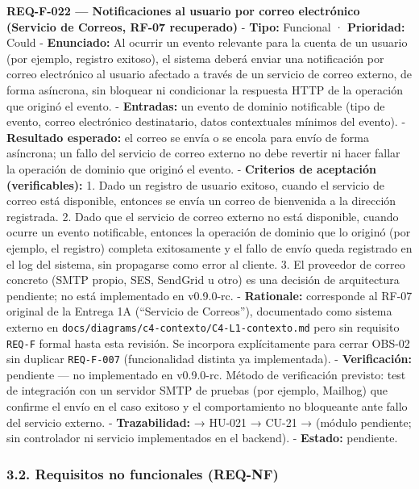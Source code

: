 \documentclass[
]{article}
\begin{document}
\textbf{REQ-F-022 --- Notificaciones al usuario por correo electrónico
(Servicio de Correos, RF-07 recuperado)} - \textbf{Tipo:} Funcional ·
\textbf{Prioridad:} Could - \textbf{Enunciado:} Al ocurrir un evento
relevante para la cuenta de un usuario (por ejemplo, registro exitoso),
el sistema deberá enviar una notificación por correo electrónico al
usuario afectado a través de un servicio de correo externo, de forma
asíncrona, sin bloquear ni condicionar la respuesta HTTP de la operación
que originó el evento. - \textbf{Entradas:} un evento de dominio
notificable (tipo de evento, correo electrónico destinatario, datos
contextuales mínimos del evento). - \textbf{Resultado esperado:} el
correo se envía o se encola para envío de forma asíncrona; un fallo del
servicio de correo externo no debe revertir ni hacer fallar la operación
de dominio que originó el evento. - \textbf{Criterios de aceptación
(verificables):} 1. Dado un registro de usuario exitoso, cuando el
servicio de correo está disponible, entonces se envía un correo de
bienvenida a la dirección registrada. 2. Dado que el servicio de correo
externo no está disponible, cuando ocurre un evento notificable,
entonces la operación de dominio que lo originó (por ejemplo, el
registro) completa exitosamente y el fallo de envío queda registrado en
el log del sistema, sin propagarse como error al cliente. 3. El
proveedor de correo concreto (SMTP propio, SES, SendGrid u otro) es una
decisión de arquitectura pendiente; no está implementado en v0.9.0-rc. -
\textbf{Rationale:} corresponde al RF-07 original de la Entrega 1A
(``Servicio de Correos''), documentado como sistema externo en
\texttt{docs/diagrams/c4-contexto/C4-L1-contexto.md} pero sin requisito
\texttt{REQ-F} formal hasta esta revisión. Se incorpora explícitamente
para cerrar OBS-02 sin duplicar \texttt{REQ-F-007} (funcionalidad
distinta ya implementada). - \textbf{Verificación:} pendiente --- no
implementado en v0.9.0-rc. Método de verificación previsto: test de
integración con un servidor SMTP de pruebas (por ejemplo, Mailhog) que
confirme el envío en el caso exitoso y el comportamiento no bloqueante
ante fallo del servicio externo. - \textbf{Trazabilidad:} → HU-021 →
CU-21 → (módulo pendiente; sin controlador ni servicio implementados en
el backend). - \textbf{Estado:} pendiente.

\hypertarget{requisitos-no-funcionales-req-nf}{%
\subsubsection{3.2. Requisitos no funcionales
(REQ-NF)}\label{requisitos-no-funcionales-req-nf}}
\end{document}
